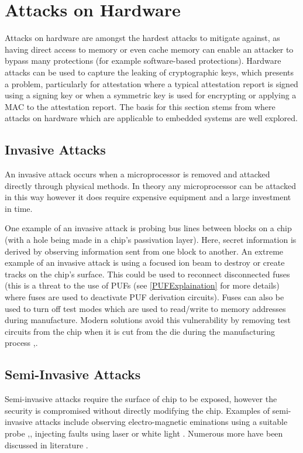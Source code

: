 \UseRawInputEncoding
\section{Attacks on Hardware} \label{hardwareAttacks}

Attacks on hardware are amongst the hardest attacks to mitigate against, as having direct access to memory or even cache memory can enable an attacker to bypass many protections (for example software-based protections). Hardware attacks can be used to capture the leaking of cryptographic keys, which presents a problem, particularly for attestation where a typical attestation report is signed using a signing key or when a symmetric key is used for encrypting or applying a MAC to the attestation report. The basis for this section stems from \cite{MayesKeithE2008SCTS} where attacks on hardware which are applicable to embedded systems are well explored.

\subsection{Invasive Attacks}
An invasive attack occurs when a microprocessor is removed and attacked directly through physical methods. In theory any microprocessor can be attacked in this way however it does require expensive equipment and a large investment in time.

One example of an invasive attack is probing bus lines between blocks on a chip (with a hole being made in a chip's passivation layer). Here, secret information is derived by observing information sent from one block to another. An extreme example of an invasive attack is using a focused ion beam to destroy or create tracks on the chip's surface. This could be used to reconnect disconnected fuses (this is a threat to the use of PUFs (see \ref{PUFExplaination} for more details) where fuses are used to deactivate PUF derivation circuits). Fuses can also be used to turn off test modes which are used to read\slash write to memory addresses during manufacture. Modern solutions avoid this vulnerability by removing test circuits from the chip when it is cut from the die during the manufacturing process \cite{Anderson1996},\cite{Kommerling1999}.

\subsection{Semi-Invasive Attacks}

Semi-invasive attacks  require the surface of chip to be exposed, however the security is compromised without directly modifying the chip. Examples of semi-invasive attacks include observing electro-magnetic eminations using a suitable probe \cite{Gandolfi2007},\cite{Quisquater2001}, injecting faults using laser \cite{Bar-el2006} or white light \cite{Skorobogatov2007}. Numerous more have been discussed in literature \cite{Skorobogatov2005}.

